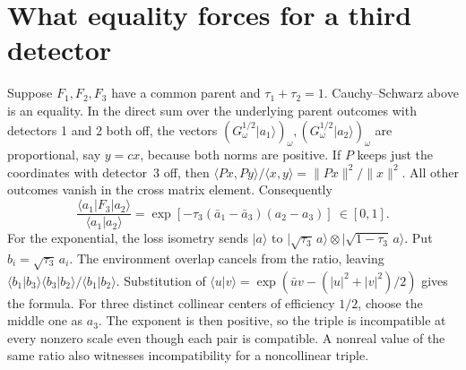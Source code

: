 \documentclass[10pt,a4paper]{article}
\newcommand{\ket}[1]{\lvert #1\rangle}
\begin{document}
\section{What equality forces for a third detector}
Suppose \(F_1,F_2,F_3\) have a common parent and \(\tau_1+\tau_2=1\).
Cauchy--Schwarz above is an equality. In the direct sum over the underlying
parent outcomes with detectors 1 and 2 both off, the vectors
\((G_\omega^{1/2}\ket{a_1})_\omega,(G_\omega^{1/2}\ket{a_2})_\omega\)
are proportional, say \(y=cx\), because both norms are positive. If \(P\) keeps just the coordinates with detector~3 off, then \(\langle Px,Py\rangle/\langle x,y\rangle=\|Px\|^2/\|x\|^2\). All other outcomes vanish in the cross matrix element. Consequently
\[
 \frac{\langle a_1|F_3|a_2\rangle}{\langle a_1|a_2\rangle}
 = \exp[-\tau_3(\bar a_1-\bar a_3)(a_2-a_3)]\ \in[0,1].
\]
For the exponential, the loss isometry sends \(\ket a\) to
\(\ket{\sqrt{\tau_3}\,a}\otimes\ket{\sqrt{1-\tau_3}\,a}\).
Put \(b_i=\sqrt{\tau_3}\,a_i\). The environment overlap cancels from the ratio, leaving
\(\langle b_1|b_3\rangle\langle b_3|b_2\rangle/\langle b_1|b_2\rangle\).
Substitution of \(\langle u|v\rangle=\exp(\bar u v-(|u|^2+|v|^2)/2)\) gives the formula.
For three distinct collinear centers of efficiency \(1/2\), choose the middle
one as \(a_3\). The exponent is then positive, so the triple is incompatible
at every nonzero scale even though each pair is compatible. A nonreal value
of the same ratio also witnesses incompatibility for a noncollinear triple.
\end{document}
